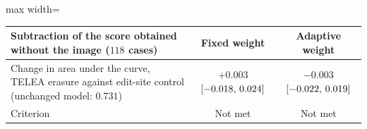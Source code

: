 \begin{table}[!htbp]
\vspace{0.6em}
\begin{adjustbox}{max width=\linewidth}
\begin{tabular}{lcc}
\toprule
Subtraction of the score obtained without the image ($118$ cases) & Fixed weight & Adaptive weight \\
\midrule
Change in area under the curve, TELEA erasure against edit-site control (unchanged model: $0.731$) & $+0.003$ $[-0.018,\,0.024]$ & $-0.003$ $[-0.022,\,0.019]$ \\
Criterion & Not met & Not met \\
\bottomrule
\end{tabular}
\end{adjustbox}
\end{table}

